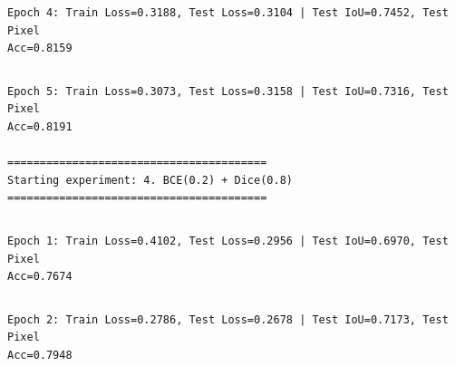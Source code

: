 \documentclass[11pt]{article}
\begin{document}
    \begin{Verbatim}[commandchars=\\\{\}]

    \end{Verbatim}

    \begin{Verbatim}[commandchars=\\\{\}]
Epoch 4: Train Loss=0.3188, Test Loss=0.3104 | Test IoU=0.7452, Test Pixel
Acc=0.8159
    \end{Verbatim}

    \begin{Verbatim}[commandchars=\\\{\}]

    \end{Verbatim}

    \begin{Verbatim}[commandchars=\\\{\}]
Epoch 5: Train Loss=0.3073, Test Loss=0.3158 | Test IoU=0.7316, Test Pixel
Acc=0.8191

========================================
Starting experiment: 4. BCE(0.2) + Dice(0.8)
========================================
    \end{Verbatim}

    \begin{Verbatim}[commandchars=\\\{\}]

    \end{Verbatim}

    \begin{Verbatim}[commandchars=\\\{\}]
Epoch 1: Train Loss=0.4102, Test Loss=0.2956 | Test IoU=0.6970, Test Pixel
Acc=0.7674
    \end{Verbatim}

    \begin{Verbatim}[commandchars=\\\{\}]

    \end{Verbatim}

    \begin{Verbatim}[commandchars=\\\{\}]
Epoch 2: Train Loss=0.2786, Test Loss=0.2678 | Test IoU=0.7173, Test Pixel
Acc=0.7948
    \end{Verbatim}

    \begin{Verbatim}[commandchars=\\\{\}]

    \end{Verbatim}
\end{document}
